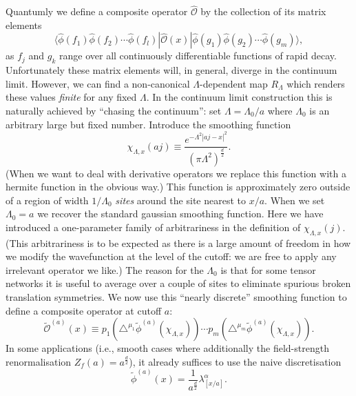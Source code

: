 \documentclass[prl,twocolumn,lengthcheck,superscriptaddress]{revtex4-1}
\theoremstyle{definition}
\theoremstyle{remark}
\begin{document}
Quantumly we define a composite operator $\widehat{\mathcal{O}}$ by the collection of its matrix elements
\begin{equation}
	\langle \widehat{\phi}(f_1)\widehat{\phi}(f_2)\cdots \widehat{\phi}(f_l)|\widehat{\mathcal{O}}(x)|\widehat{\phi}(g_1)\widehat{\phi}(g_2)\cdots \widehat{\phi}(g_m)\rangle,
\end{equation}
as $f_j$ and $g_k$ range over all continuously differentiable functions of rapid decay. Unfortunately these matrix elements will, in general, diverge in the continuum limit. However, we can find a non-canonical $\Lambda$-dependent map $R_\Lambda$ which renders these values \emph{finite} for any fixed $\Lambda$. In the continuum limit construction this is naturally achieved by ``chasing the continuum'': set $\Lambda = \Lambda_0/a$ where 
$\Lambda_0$ is an arbitrary large but fixed number. Introduce the smoothing function
\begin{equation}
	\chi_{\Lambda, x}(aj) \equiv \frac{e^{-\Lambda^2{|aj-x|^2}}}{(\pi\Lambda^2)^{\frac{d}{2}}}.
\end{equation}
(When we want to deal with derivative operators we replace this function with a hermite function in the obvious way.)
This function is approximately zero outside of a region of width $1/\Lambda_0$ \emph{sites} around the site nearest to $x/a$. When we set $\Lambda_0 = a$ we recover the standard gaussian smoothing function. Here we have introduced a one-parameter family of arbitrariness in the definition of $\chi_{\Lambda, x}(j)$. (This arbitrariness is to be expected as there is a large amount of freedom in how we modify the wavefunction at the level of the cutoff: we are free to apply any irrelevant operator we like.) The reason for the $\Lambda_0$ is that for some tensor networks it is useful to average over a couple of sites to eliminate spurious broken translation symmetries. We now use this ``nearly discrete'' smoothing function to define a composite operator at cutoff $a$:
\begin{equation}
	\widetilde{\mathcal{O}}^{(a)}(x) \equiv p_1(\triangle^{\mu_1}\widetilde{\phi}^{(a)}(\chi_{\Lambda, x}))\cdots p_m(\triangle^{\mu_m}\widetilde{\phi}^{(a)}(\chi_{\Lambda, x})).
\end{equation}
In some applications (i.e., smooth cases where additionally the field-strength renormalisation $Z_f(a) = a^{\frac{d}{2}}$), it already suffices to use the naive discretisation
\begin{equation}
	\widetilde{\phi}^{(a)}(x) = \frac{1}{a^{\frac{d}{2}}}\lambda^\alpha_{[x/a]}.
\end{equation}
\end{document}
